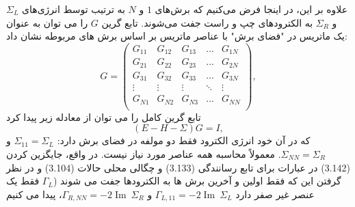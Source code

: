 علاوه بر این، در اینجا فرض می‌کنیم که برش‌های $1$ و $N$ به ترتیب توسط انرژی‌های $\Sigma_L$ و $\Sigma_R$ به الکترودهای چپ و راست جفت می‌شوند.
تابع گرین $G$ را می توان به عنوان یک ماتریس در "فضای برش" با عناصر ماتریس بر اساس برش های مربوطه نشان داد:
\begin{equation}
    G=\left( \begin{matrix}
           {{G}_{11}} & {{G}_{12}} & {{G}_{13}} & \ldots  & {{G}_{1N}}  \\
           {{G}_{21}} & {{G}_{22}} & {{G}_{23}} & \ldots  & {{G}_{2N}}  \\
           {{G}_{31}} & {{G}_{32}} & {{G}_{33}} & \ldots  & {{G}_{3N}}  \\
           \vdots  & \vdots  & \vdots  & \ddots  & \vdots   \\
           {{G}_{N1}} & {{G}_{N2}} & {{G}_{N3}} & \ldots  & {{G}_{NN}}  \\
        \end{matrix} \right),
\end{equation}
تابع گرین کامل را می توان از معادله زیر پیدا کرد
\begin{equation}
    \left( E-H-\Sigma  \right)G=I,
\end{equation}
که در آن خود انرژی الکترود فقط دو مولفه در فضای برش دارد: $\Sigma_{11} = \Sigma_{L}$ و $\Sigma_{NN} = \Sigma_{R}$.
معمولاً محاسبه همه عناصر مورد نیاز نیست. در واقع، جایگزین کردن (3.142) در عبارات برای تابع رسانندگی (3.133) و چگالی محلی حالات (3.104) و در نظر گرفتن این که فقط اولین و آخرین برش ها به الکترودها جفت می شوند ($\Gamma_{L}$ فقط یک عنصر غیر صفر دارد ${{\Gamma }_{L,11}}=-2\operatorname{Im}\ {{\Sigma }_{L}}$ و ${{\Gamma }_{R,NN}}=-2\operatorname{Im}\ {{\Sigma }_{R}}$، پیدا می کنیم 
